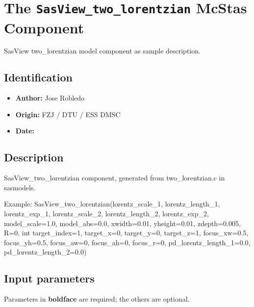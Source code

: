 \section{The \texttt{SasView\_two\_lorentzian} McStas Component}
SasView two\_lorentzian model component as sample description.

\subsection*{Identification}
\begin{itemize}
  \item \textbf{Author:} Jose Robledo
  \item \textbf{Origin:} FZJ / DTU / ESS DMSC
  \item \textbf{Date:} 
\end{itemize}

\subsection*{Description}
SasView\_two\_lorentzian component, generated from two\_lorentzian.c in sasmodels.

Example: SasView\_two\_lorentzian(lorentz\_scale\_1, lorentz\_length\_1, lorentz\_exp\_1, lorentz\_scale\_2, lorentz\_length\_2, lorentz\_exp\_2, model\_scale=1.0, model\_abs=0.0, xwidth=0.01, yheight=0.01, zdepth=0.005, R=0, int target\_index=1, target\_x=0, target\_y=0, target\_z=1, focus\_xw=0.5, focus\_yh=0.5, focus\_aw=0, focus\_ah=0, focus\_r=0, pd\_lorentz\_length\_1=0.0, pd\_lorentz\_length\_2=0.0)

\subsection*{Input parameters}
Parameters in \textbf{boldface} are required; the others are optional.

